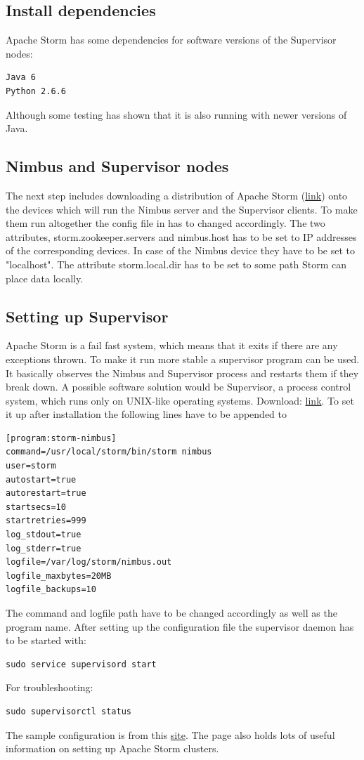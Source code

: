 \documentclass[12pt,a4paper]{article}
\begin{document}
\subsection{Install dependencies}
Apache Storm has some dependencies for software versions of the Supervisor nodes:
\begin{verbatim}
Java 6
Python 2.6.6
\end{verbatim}
Although some testing has shown that it is also running with newer versions of Java.
\subsection{Nimbus and Supervisor nodes}
The next step includes downloading a distribution of Apache Storm (\href{http://storm.apache.org/downloads.html}{link}) onto the devices which will run the Nimbus server and the Supervisor clients.
To make them run altogether the config file in  has to changed accordingly. The two attributes, storm.zookeeper.servers and nimbus.host has to be set to IP addresses of the corresponding devices. In case of the Nimbus device they have to be set to "localhost". The attribute storm.local.dir has to be set to some path Storm can place data locally.
\subsection{Setting up Supervisor}
Apache Storm is a fail fast system, which means that it exits if there are any exceptions thrown. To make it run more stable a supervisor program can be used. It basically observes the Nimbus and Supervisor process and restarts them if they break down. A possible software solution would be Supervisor, a process control system, which runs only on UNIX-like operating systems. Download: \href{http://supervisord.org/#}{link}.
To set it up after installation the following lines have to be appended to 
\begin{verbatim}
[program:storm-nimbus]
command=/usr/local/storm/bin/storm nimbus
user=storm
autostart=true
autorestart=true
startsecs=10
startretries=999
log_stdout=true
log_stderr=true
logfile=/var/log/storm/nimbus.out
logfile_maxbytes=20MB
logfile_backups=10
\end{verbatim}
The command and logfile path have to be changed accordingly as well as the program name. After setting up the configuration file the supervisor daemon has to be started with: 
\begin{verbatim}
sudo service supervisord start
\end{verbatim}
For troubleshooting:
\begin{verbatim}
sudo supervisorctl status
\end{verbatim}
The sample configuration is from this \href{http://www.michael-noll.com/tutorials/running-multi-node-storm-cluster/#install-supervisord}{site}. The page also holds lots of useful information on setting up Apache Storm clusters.
\end{document}
